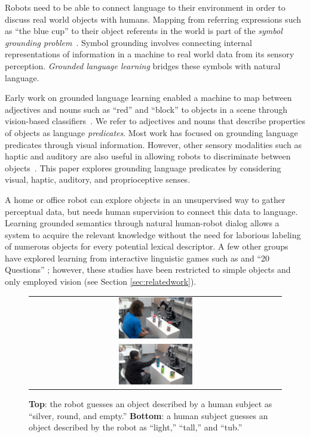 Robots need to be able to connect language to their environment in order to discuss real world objects with humans.
Mapping from referring expressions such as ``the blue cup'' to their object referents in the world is part of the \textit{symbol grounding problem}~\cite{harnad:phys90}.
Symbol grounding involves connecting internal representations of information in a machine to real world data from its sensory perception.
\textit{Grounded language learning} bridges these symbols with natural language.

Early work on grounded language learning enabled a machine to map between adjectives and nouns such as ``red'' and ``block'' to objects in a scene through vision-based classifiers~\cite{roy:evocomm01}.
We refer to adjectives and nouns that describe properties of objects as language \textit{predicates}.
Most work has focused on grounding language predicates through visual information. However, other sensory modalities such as haptic and auditory are also useful in allowing robots to discriminate between objects~\cite{sinapov:icra14}.
This paper explores grounding language predicates by considering visual, haptic, auditory, and proprioceptive senses. 

A home or office robot can explore objects in an unsupervised way to gather perceptual data, but needs human supervision to connect this data to language.
Learning grounded semantics through natural human-robot dialog allows a system to acquire the relevant knowledge without the need for laborious labeling of numerous objects for every potential lexical descriptor.
A few other groups have explored learning from interactive linguistic games such as \ispy and ``20 Questions'' \cite{parde:ijcai15,vogel:aaai10}; however, these studies have been restricted to simple objects and only employed vision (see Section \ref{sec:relatedwork}).

\begin{figure}
\centering
\begin{tabular}{c}
	\includegraphics[width=0.3\textwidth]{figures/silver_round_and_empty.png} \\
	\includegraphics[width=0.3\textwidth]{figures/light_tall_tub.jpg} \\
\end{tabular}
\caption{\textbf{Top}: the robot guesses an object described by a human subject as ``silver, round, and empty.'' \textbf{Bottom}: a human subject guesses an object described by the robot as ``light,'' ``tall,'' and ``tub.''}
\label{fig:ispy}
\end{figure}

